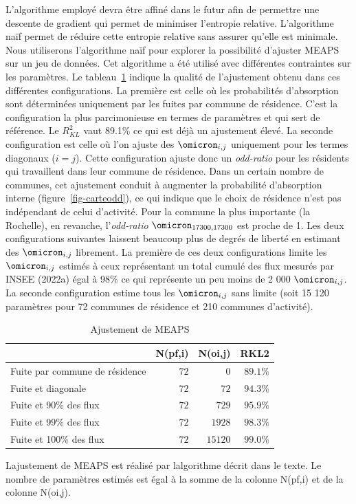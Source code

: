 \documentclass[
  10pt,
  a4paper,
  numbers=noendperiod,
  DIV=9]{scrreprt}
\begin{document}
L'algorithme employé devra être affiné dans le futur afin de permettre
une descente de gradient qui permet de minimiser l'entropie relative.
L'algorithme naïf permet de réduire cette entropie relative sans assurer
qu'elle est minimale. Nous utiliserons l'algorithme naïf pour explorer
la possibilité d'ajuster MEAPS sur un jeu de données. Cet algorithme a
été utilisé avec différentes contraintes sur les paramètres. Le
tableau~\ref{tbl-meapsR2} indique la qualité de l'ajustement obtenu dans
ces différentes configurations. La première est celle où les
probabilités d'absorption sont déterminées uniquement par les fuites par
commune de résidence. C'est la configuration la plus parcimonieuse en
termes de paramètres et qui sert de référence. Le \(R^2_{KL}\) vaut
89.1\% ce qui est déjà un ajustement élevé. La seconde configuration est
celle où l'on ajuste des \(\omicron_{i,j}\) uniquement pour les termes
diagonaux (\(i=j\)). Cette configuration ajuste donc un \emph{odd-ratio}
pour les résidents qui travaillent dans leur commune de résidence. Dans
un certain nombre de communes, cet ajustement conduit à augmenter la
probabilité d'absorption interne (figure~\ref{fig-carteodd}), ce qui
indique que le choix de résidence n'est pas indépendant de celui
d'activité. Pour la commune la plus importante (la Rochelle), en
revanche, l'\emph{odd-ratio} \(\omicron_{17300, 17300}\) est proche de
1. Les deux configurations suivantes laissent beaucoup plus de degrés de
liberté en estimant des \(\omicron_{i,j}\) librement. La première de ces
deux configurations limite les \(\omicron_{i,j}\) estimés à ceux
représentant un total cumulé des flux mesurés par INSEE (2022a) égal à
98\% ce qui représente un peu moins de 2 000 \(\omicron_{i,j}\). La
seconde configuration estime tous les \(\omicron_{i,j}\) sans limite
(soit 15 120 paramètres pour 72 communes de résidence et 210 communes
d'activité).

\hypertarget{tbl-meapsR2}{}
\setlength{\LTpost}{0mm}
\begin{longtable}{lrrr}
\caption{\label{tbl-meapsR2}Ajustement de MEAPS }\tabularnewline

\toprule
 & N(pf,i) & N(oi,j) & RKL2 \\ 
\midrule
Fuite par commune de résidence & $72$ & $0$ & $89.1\%$ \\ 
Fuite et diagonale & $72$ & $72$ & $94.3\%$ \\ 
Fuite et 90\% des flux & $72$ & $729$ & $95.9\%$ \\ 
Fuite et 99\% des flux & $72$ & $1 928$ & $98.3\%$ \\ 
Fuite et 100\% des flux & $72$ & $15 120$ & $99.0\%$ \\ 
\bottomrule
\end{longtable}
\begin{minipage}{\linewidth}
L\textquotesingle{}ajustement de MEAPS est réalisé par l\textquotesingle{}algorithme décrit dans le texte. Le nombre de paramètres estimés est égal à la somme de la colonne N(pf,i) et de la colonne N(oi,j).\\
\end{minipage}
\end{document}

